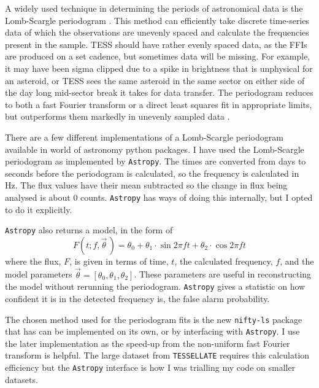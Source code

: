 \documentclass{UCreport}
\begin{document}
A widely used technique in determining the periods of astronomical data is the Lomb-Scargle periodogram \citep[\citet{Lomb1976,Scargle1982}, but see][for a review]{VanderPlas2018}.
This method can efficiently take discrete time-series data of which the observations are unevenly spaced and calculate the frequencies present in the sample.
TESS should have rather evenly spaced data, as the FFIs are produced on a set cadence, but sometimes data will be missing.
For example, it may have been sigma clipped due to a spike in brightness that is unphysical for an asteroid, or TESS sees the same asteroid in the same sector on either side of the day long mid-sector break it takes for data transfer.
The periodogram reduces to both a fast Fourier transform or a direct least squares fit in appropriate limits, but outperforms them markedly in unevenly sampled data \citep{VanderPlas2018}.

There are a few different implementations of a Lomb-Scargle periodogram available in world of astronomy python packages.
I have used the Lomb-Scargle periodogram as implemented by \texttt{Astropy}\citep[\citet{Astropy2022} but see][for the implementation]{Vanderplas2012,Vanderplas2015}.
The times are converted from days to seconds before the periodogram is calculated, so the frequency is calculated in \unit{\hertz}.
The flux values have their mean subtracted so the change in flux being analysed is about 0 counts.
\texttt{Astropy} has ways of doing this internally, but I opted to do it explicitly.

\texttt{Astropy} also returns a model, in the form of
\begin{equation}
  \label{Eq:LCModel}
  F(t;f,\vec{\theta}\,) = \theta_0 + \theta_1\cdot\sin{2\pi ft} +\theta_2\cdot\cos{2\pi ft}
\end{equation}
where the flux, $F$, is given in terms of time, $t$, the calculated frequency, $f$, and the model parameters $\vec{\theta} = [\theta_0, \theta_1,\theta_2]$.
These parameters are useful in reconstructing the model without rerunning the periodogram.
\texttt{Astropy} gives a statistic on how confident it is in the detected frequency is, the false alarm probability.

The chosen method used for the periodogram fits is the new \texttt{nifty-ls} package \citep{Garrison2024} that has can be implemented on its own, or by interfacing with \texttt{Astropy}.
I use the later implementation as the speed-up from the non-uniform fast Fourier transform is helpful.
The large dataset from \texttt{TESSELLATE} requires this calculation efficiency but the \texttt{Astropy} interface is how I was trialling my code on smaller datasets.
\end{document}
